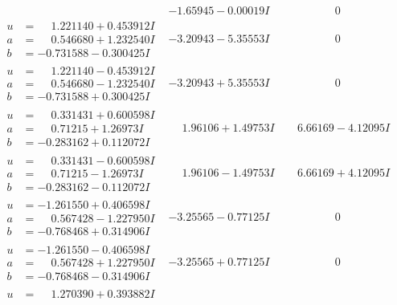 \documentclass[1p]{elsarticle_modified}
\theoremstyle{definition}
\begin{document}
$$\begin{array}{c|c|c}
 & -1.65945 - 0.00019 I & \phantom{-0.000000 } 0 \\ \hline\begin{aligned}
u &= \phantom{-}1.221140 + 0.453912 I \\
a &= \phantom{-}0.546680 + 1.232540 I \\
b &= -0.731588 - 0.300425 I\end{aligned}
 & -3.20943 - 5.35553 I & \phantom{-0.000000 } 0 \\ \hline\begin{aligned}
u &= \phantom{-}1.221140 - 0.453912 I \\
a &= \phantom{-}0.546680 - 1.232540 I \\
b &= -0.731588 + 0.300425 I\end{aligned}
 & -3.20943 + 5.35553 I & \phantom{-0.000000 } 0 \\ \hline\begin{aligned}
u &= \phantom{-}0.331431 + 0.600598 I \\
a &= \phantom{-}0.71215 + 1.26973 I \\
b &= -0.283162 + 0.112072 I\end{aligned}
 & \phantom{-}1.96106 + 1.49753 I & \phantom{-}6.66169 - 4.12095 I \\ \hline\begin{aligned}
u &= \phantom{-}0.331431 - 0.600598 I \\
a &= \phantom{-}0.71215 - 1.26973 I \\
b &= -0.283162 - 0.112072 I\end{aligned}
 & \phantom{-}1.96106 - 1.49753 I & \phantom{-}6.66169 + 4.12095 I \\ \hline\begin{aligned}
u &= -1.261550 + 0.406598 I \\
a &= \phantom{-}0.567428 - 1.227950 I \\
b &= -0.768468 + 0.314906 I\end{aligned}
 & -3.25565 - 0.77125 I & \phantom{-0.000000 } 0 \\ \hline\begin{aligned}
u &= -1.261550 - 0.406598 I \\
a &= \phantom{-}0.567428 + 1.227950 I \\
b &= -0.768468 - 0.314906 I\end{aligned}
 & -3.25565 + 0.77125 I & \phantom{-0.000000 } 0 \\ \hline\begin{aligned}
u &= \phantom{-}1.270390 + 0.393882 I \\

\end{aligned}
\end{array}$$
\end{document}
